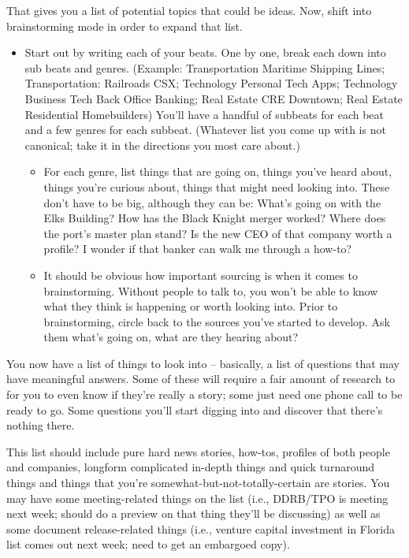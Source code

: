 \documentclass[
  11pt,
  american,
  letterpaperpaper,
  extrafontsizes,onecolumn,openright
  ]{memoir}
\providecommand{\tightlist}{%
  \setlength{\itemsep}{0pt}\setlength{\parskip}{0pt}}
\begin{document}
That gives you a list of potential topics that could be ideas. Now, shift into brainstorming mode in order to expand that list.

\begin{itemize}
\tightlist
\item
  Start out by writing each of your beats. One by one, break each down into sub beats and genres. (Example: Transportation \textbar{} Maritime \textbar{} Shipping Lines; Transportation: Railroads \textbar{} CSX; Technology \textbar{} Personal Tech \textbar{} Apps; Technology \textbar{} Business Tech \textbar{} Back Office Banking; Real Estate \textbar{} CRE \textbar{} Downtown; Real Estate \textbar{} Residential \textbar{} Homebuilders) You'll have a handful of subbeats for each beat and a few genres for each subbeat. (Whatever list you come up with is not canonical; take it in the directions you most care about.)

  \begin{itemize}
  \tightlist
  \item
    For each genre, list things that are going on, things you've heard about, things you're curious about, things that might need looking into. These don't have to be big, although they can be: What's going on with the Elks Building? How has the Black Knight merger worked? Where does the port's master plan stand? Is the new CEO of that company worth a profile? I wonder if that banker can walk me through a how-to?
  \item
    It should be obvious how important sourcing is when it comes to brainstorming. Without people to talk to, you won't be able to know what they think is happening or worth looking into. Prior to brainstorming, circle back to the sources you've started to develop. Ask them what's going on, what are they hearing about?
  \end{itemize}
\end{itemize}

You now have a list of things to look into -- basically, a list of questions that may have meaningful answers. Some of these will require a fair amount of research to for you to even know if they're really a story; some just need one phone call to be ready to go. Some questions you'll start digging into and discover that there's nothing there.

This list should include pure hard news stories, how-tos, profiles of both people and companies, longform complicated in-depth things and quick turnaround things and things that you're somewhat-but-not-totally-certain are stories. You may have some meeting-related things on the list (i.e., DDRB/TPO is meeting next week; should do a preview on that thing they'll be discussing) as well as some document release-related things (i.e., venture capital investment in Florida list comes out next week; need to get an embargoed copy).
\end{document}
